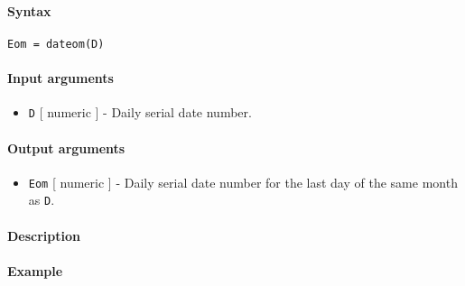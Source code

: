 


	\paragraph{Syntax}\label{syntax}

\begin{verbatim}
Eom = dateom(D)
\end{verbatim}

\paragraph{Input arguments}\label{input-arguments}

\begin{itemize}
\itemsep1pt\parskip0pt
\item
  \texttt{D} {[} numeric {]} - Daily serial date number.
\end{itemize}

\paragraph{Output arguments}\label{output-arguments}

\begin{itemize}
\itemsep1pt\parskip0pt
\item
  \texttt{Eom} {[} numeric {]} - Daily serial date number for the last
  day of the same month as \texttt{D}.
\end{itemize}

\paragraph{Description}\label{description}

\paragraph{Example}\label{example}


